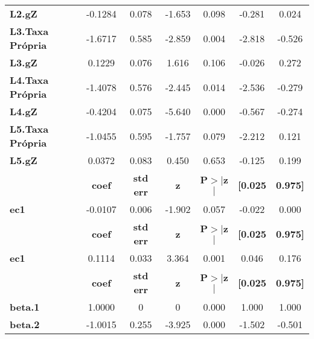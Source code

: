 \begin{center}
\begin{tabular}{lcccccc}
\textbf{L2.gZ}           &      -0.1284  &        0.078     &    -1.653  &         0.098        &       -0.281    &        0.024     \\
\textbf{L3.Taxa Própria} &      -1.6717  &        0.585     &    -2.859  &         0.004        &       -2.818    &       -0.526     \\
\textbf{L3.gZ}           &       0.1229  &        0.076     &     1.616  &         0.106        &       -0.026    &        0.272     \\
\textbf{L4.Taxa Própria} &      -1.4078  &        0.576     &    -2.445  &         0.014        &       -2.536    &       -0.279     \\
\textbf{L4.gZ}           &      -0.4204  &        0.075     &    -5.640  &         0.000        &       -0.567    &       -0.274     \\
\textbf{L5.Taxa Própria} &      -1.0455  &        0.595     &    -1.757  &         0.079        &       -2.212    &        0.121     \\
\textbf{L5.gZ}           &       0.0372  &        0.083     &     0.450  &         0.653        &       -0.125    &        0.199     \\
             & \textbf{coef} & \textbf{std err} & \textbf{z} & \textbf{P$> |$z$|$} & \textbf{[0.025} & \textbf{0.975]}  \\
\midrule
\textbf{ec1} &      -0.0107  &        0.006     &    -1.902  &         0.057        &       -0.022    &        0.000     \\
             & \textbf{coef} & \textbf{std err} & \textbf{z} & \textbf{P$> |$z$|$} & \textbf{[0.025} & \textbf{0.975]}  \\
\midrule
\textbf{ec1} &       0.1114  &        0.033     &     3.364  &         0.001        &        0.046    &        0.176     \\
                & \textbf{coef} & \textbf{std err} & \textbf{z} & \textbf{P$> |$z$|$} & \textbf{[0.025} & \textbf{0.975]}  \\
\midrule
\textbf{beta.1} &       1.0000  &            0     &         0  &         0.000        &        1.000    &        1.000     \\
\textbf{beta.2} &      -1.0015  &        0.255     &    -3.925  &         0.000        &       -1.502    &       -0.501     \\
\bottomrule
\end{tabular}
\end{center}
